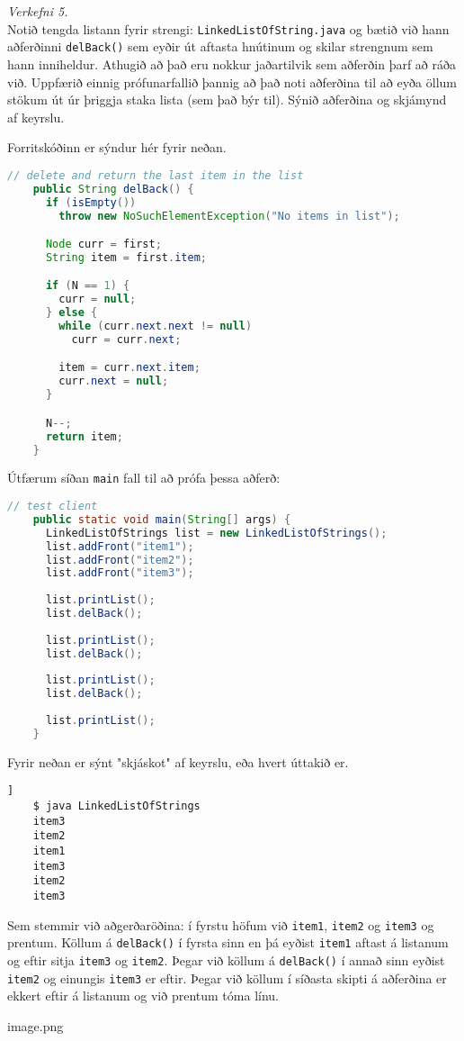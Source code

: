 \documentclass[a4paper, 12pt]{article}
\begin{document}
\newpage
\noindent
\emph{Verkefni 5.} \\
Notið tengda listann fyrir strengi: \texttt{LinkedListOfString.java} og bætið við 
hann aðferðinni \texttt{delBack()} sem eyðir út aftasta hnútinum og skilar strengnum sem 
hann inniheldur.  Athugið að það eru nokkur jaðartilvik sem aðferðin þarf að ráða við.  
Uppfærið einnig prófunarfallið þannig að það noti aðferðina til að eyða öllum stökum út 
úr þriggja staka lista (sem það býr til).  Sýnið aðferðina og skjámynd af keyrslu. 

\begin{description}[leftmargin=!,labelwidth=\widthof{\bfseries Example:},labelindent=0em, ]
  \item[Úrlausn]
  Forritskóðinn er sýndur hér fyrir neðan.
  \begin{lstlisting}[language=java]
    // delete and return the last item in the list
    public String delBack() {
      if (isEmpty())
        throw new NoSuchElementException("No items in list");

      Node curr = first;
      String item = first.item;

      if (N == 1) {
        curr = null;
      } else {
        while (curr.next.next != null)
          curr = curr.next;

        item = curr.next.item;
        curr.next = null;
      }

      N--;
      return item;
    }
  \end{lstlisting}
  Útfærum síðan \texttt{main} fall til að prófa þessa aðferð:
  \begin{lstlisting}[language=java]
    // test client
    public static void main(String[] args) {
      LinkedListOfStrings list = new LinkedListOfStrings();
      list.addFront("item1");
      list.addFront("item2");
      list.addFront("item3");
  
      list.printList();
      list.delBack();
  
      list.printList();
      list.delBack();
  
      list.printList();
      list.delBack();
  
      list.printList();
    }
  \end{lstlisting}
  Fyrir neðan er sýnt "skjáskot" af keyrslu, eða hvert úttakið er.
  \begin{lstlisting}]
    $ java LinkedListOfStrings
    item3
    item2
    item1
    item3
    item2
    item3
  \end{lstlisting}
  Sem stemmir við aðgerðaröðina: í fyrstu höfum við \texttt{item1}, \texttt{item2} og \texttt{item3}
  og prentum. Köllum á \texttt{delBack()} í fyrsta sinn en þá eyðist \texttt{item1} aftast á listanum
  og eftir sitja \texttt{item3} og \texttt{item2}. Þegar við köllum á \texttt{delBack()} í annað sinn eyðist
  \texttt{item2} og einungis \texttt{item3} er eftir. Þegar við köllum í síðasta skipti á aðferðina er ekkert
  eftir á listanum og við prentum tóma línu.
\end{description}
image.png
\end{document}
